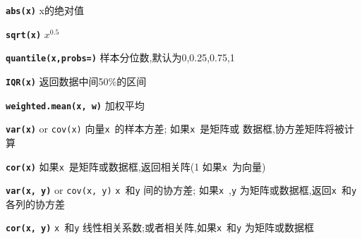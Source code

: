 \documentclass[landscape]{article}
\newcommand{\code}{\texttt}
\newcommand{\bcode}[1]{\texttt{\textbf{#1}}}
\begin{document}
\begin{multicols*}{3}



\bcode{abs(x)}  x的绝对值

\bcode{sqrt(x)} $x^{0.5}$


\bcode{quantile(x,probs=)} 样本分位数,默认为0,0.25,0.75,1

\bcode{IQR(x)}  返回数据中间50\%的区间

\bcode{weighted.mean(x, w)} 加权平均


\bcode{var(x)} or \code{cov(x)} 向量\code{x}~的样本方差; 如果\code{x}~是矩阵或
数据框,协方差矩阵将被计算


\bcode{cor(x)} 如果\code{x}~是矩阵或数据框,返回相关阵(1 如果\code{x}~为向量)

\bcode{var(x, y)} or \code{cov(x, y)}  \code{x}~和\code{y} 间的协方差;
如果\code{x}~,\code{y} 为矩阵或数据框,返回\code{x}~和\code{y} 各列的协方差

\bcode{cor(x, y)}  \code{x}~和\code{y} 线性相关系数;或者相关阵,如果\code{x}~和\code{y} 为矩阵或数据框


\end{multicols*}
\end{document}

